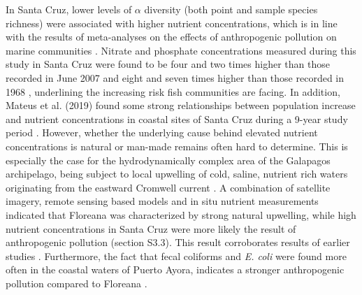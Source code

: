 In Santa Cruz, lower levels of $\alpha$ diversity (both point and sample species richness) were associated with higher nutrient concentrations, which is in line with the results of meta-analyses on the effects of anthropogenic pollution on marine communities \citep{Johnston2009ContaminantsMeta-analysis}. Nitrate and phosphate concentrations measured during this study in Santa Cruz were found to be four and two times higher than those recorded in June 2007 \citep{Palacios2009Estudio2007.} and eight and seven times higher than those recorded in 1968 \citep{Houvenaghel1978OceanographicIslands}, underlining the increasing risk fish communities are facing. In addition, Mateus et al. (2019) found some strong relationships between population increase and nutrient concentrations in coastal sites of Santa Cruz during a 9-year study period \citep{Mateus2019AnArchipelago}. However, whether the underlying cause behind elevated nutrient concentrations is natural or man-made remains often hard to determine. This is especially the case for the hydrodynamically complex area of the Galapagos archipelago, being subject to local upwelling of cold, saline, nutrient rich waters originating from the eastward Cromwell current \citep{Houvenaghel1978OceanographicIslands,Mateus2019AnArchipelago,Schaeffer2008PhytoplanktonMeasurements}. A combination of satellite imagery, remote sensing based models and in situ nutrient measurements indicated that Floreana was characterized by strong natural upwelling, while high nutrient concentrations in Santa Cruz were more likely the result of anthropogenic pollution (section S3.3). This result corroborates results of earlier studies \citep{Mateus2019AnArchipelago,Werdeman2006EffectsBays}. Furthermore, the fact that fecal coliforms and \textit{E. coli} were found more often in the coastal waters of Puerto Ayora, indicates a stronger anthropogenic pollution compared to Floreana \citep{Fernandez2008CoastalIsland,Stumpf2013InvestigatingEcuador}.



